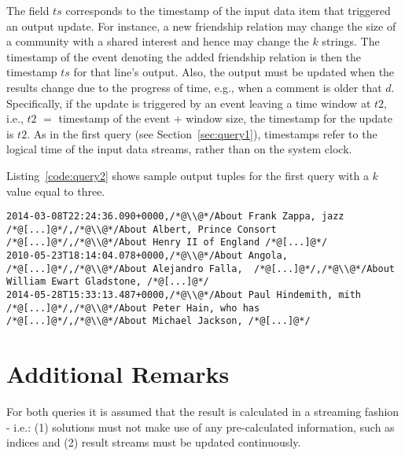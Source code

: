 \documentclass{sig-alternate}
\begin{document}
The field $ts$ corresponds to the timestamp of the input data item that triggered an output update. For instance, a new friendship relation may change the size of a community with a shared interest and hence may change the $k$ strings. The timestamp of the event denoting the added friendship relation is then the timestamp $ts$ for that line's output. Also, the output must be updated when the results change due to the progress of time, e.g., when a comment is older that $d$. Specifically, if the update is triggered by an event leaving a time window at $t2$, i.e., $t2$ $=$ timestamp of the event $+$ window size, the timestamp for the update is $t2$. As in the first query (see Section~\ref{sec:query1}), timestamps refer to the logical time of the input data streams, rather than on the system clock.

Listing~\ref{code:query2} shows sample output tuples for the first query with a $k$ value equal to three. 

\begin{lstlisting}[float=ht,caption={Output example for the community interest query},label={code:query2}]
2014-03-08T22:24:36.090+0000,/*@\\@*/About Frank Zappa, jazz /*@[...]@*/,/*@\\@*/About Albert, Prince Consort /*@[...]@*/,/*@\\@*/About Henry II of England /*@[...]@*/
2010-05-23T18:14:04.078+0000,/*@\\@*/About Angola,  /*@[...]@*/,/*@\\@*/About Alejandro Falla,  /*@[...]@*/,/*@\\@*/About William Ewart Gladstone, /*@[...]@*/
2014-05-28T15:33:13.487+0000,/*@\\@*/About Paul Hindemith, mith /*@[...]@*/,/*@\\@*/About Peter Hain, who has /*@[...]@*/,/*@\\@*/About Michael Jackson, /*@[...]@*/
\end{lstlisting}

\section{Additional Remarks}
For both queries it is assumed that the result is calculated in a streaming fashion - i.e.: (1) solutions must not make use of any pre-calculated information, such as indices and (2) result streams must be updated continuously.
\end{document}
